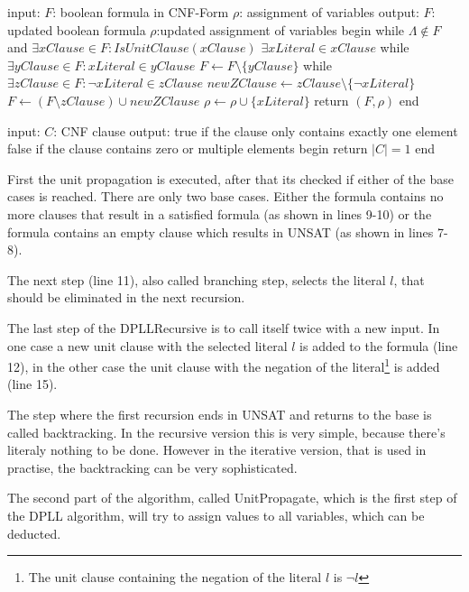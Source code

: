 \begin{adjustbox}{width=\columnwidth}
\begin{algorithm}[caption={UnitPropagate}, label={algUnitProgagate}]
 input: $F$: boolean formula in CNF-Form
	$\rho$: assignment of variables
 output: $F$: updated boolean formula
	$\rho$:updated assignment of variables
 begin
   while $\Lambda \notin F$ and $\exists xClause \in F: IsUnitClause(xClause)$
	$\exists xLiteral \in xClause$
	while $\exists yClause \in F: xLiteral \in yClause$
		$F \gets F \setminus \{yClause\}$     
	while $\exists zClause \in F: \lnot xLiteral \in zClause$
		$newZClause \gets zClause \setminus \{\lnot xLiteral\}$
		$F \gets (F \setminus zClause) \cup newZClause$
	$\rho \gets \rho \cup \{xLiteral\}$
   return $(F, \rho)$
 end
\end{algorithm}
\end{adjustbox}
\begin{algorithm}[caption={IsUnitClause}, label={algIsUnitClause}]
 input: $C$: CNF clause
 output: true if the clause only contains
		exactly one element
	false if the clause contains zero 
		or multiple elements
 begin
   return $|C| = 1$
 end
\end{algorithm}

First the unit propagation is executed, after that its checked if either of the base cases is reached. 
There are only two base cases. Either the formula contains no more clauses that result in a satisfied formula (as shown in lines 9-10) or the formula contains an empty clause which results in UNSAT (as shown in lines 7-8).

The next step (line 11), also called branching step, selects the literal $l$, that should be eliminated in the next recursion.

The last step of the DPLLRecursive is to call itself twice with a new input. In one case a new unit clause with the selected literal $l$ is added to the formula (line 12), in the other case the unit clause with the negation of the literal\footnote{The unit clause containing the negation of the literal $l$ is $\lnot l$} is added (line 15).

The step where the first recursion ends in UNSAT and returns to the base is called backtracking. In the recursive version this is very simple, because there's literaly nothing to be done. However in the iterative version, that is used in practise, the backtracking can be very sophisticated.

The second part of the algorithm, called UnitPropagate, which is the first step of the DPLL algorithm, will try to assign values to all variables, which can be deducted.

